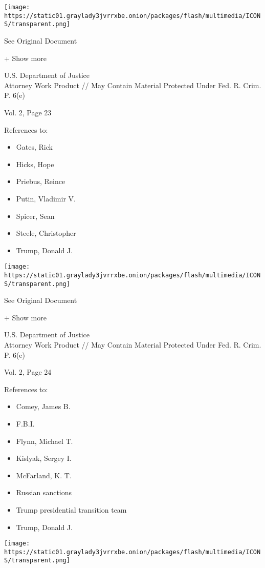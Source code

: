 \texttt{[image: https://static01.graylady3jvrrxbe.onion/packages/flash/multimedia/ICONS/transparent.png]}

See Original Document

+ Show more

U.S. Department of Justice\\
Attorney Work Product // May Contain Material Protected Under Fed. R.
Crim. P. 6(e)

Vol. 2, Page 23

References to:

\begin{itemize}
\tightlist
\item
  Gates, Rick
\item
  Hicks, Hope
\item
  Priebus, Reince
\item
  Putin, Vladimir V.
\item
  Spicer, Sean
\item
  Steele, Christopher
\item
  Trump, Donald J.
\end{itemize}

\protect\hyperlink{}{}

\texttt{[image: https://static01.graylady3jvrrxbe.onion/packages/flash/multimedia/ICONS/transparent.png]}

See Original Document

+ Show more

U.S. Department of Justice\\
Attorney Work Product // May Contain Material Protected Under Fed. R.
Crim. P. 6(e)

Vol. 2, Page 24

References to:

\begin{itemize}
\tightlist
\item
  Comey, James B.
\item
  F.B.I.
\item
  Flynn, Michael T.
\item
  Kislyak, Sergey I.
\item
  McFarland, K. T.
\item
  Russian sanctions
\item
  Trump presidential transition team
\item
  Trump, Donald J.
\end{itemize}

\protect\hyperlink{}{}

\texttt{[image: https://static01.graylady3jvrrxbe.onion/packages/flash/multimedia/ICONS/transparent.png]}

